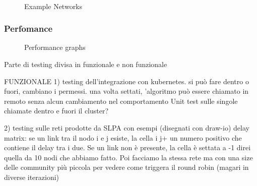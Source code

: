 \begin{figure}[]
    \centering
    \\
    \caption{Example Networks}
\end{figure}






\subsubsection*{Perfomance}


\begin{figure}[]
    \hspace*{-15pt}
    \centering
    \caption{Performance graphs}
\end{figure}


Parte di testing divisa in funzionale e non funzionale

FUNZIONALE
1) testing dell'integrazione con kubernetes.
    si può fare dentro o fuori, cambiano i permessi.
    una volta settati, 'algoritmo può essere chiamato in remoto senza alcun cambiamento nel comportamento
    Unit test sulle singole chiamate dentro e fuori il cluster?

2) testing sulle reti prodotte da SLPA con esempi (disegnati con draw-io)
    delay matrix: se un link tra il nodo i e j esiste, la cella i j+ un numero positivo che contiene il delay tra i
    due. Se un link non è presente, la cella è settata a -1 
    direi quella da 10 nodi che abbiamo fatto. Poi facciamo la stessa rete ma con una size delle 
    community più piccola per vedere come triggera il round robin (magari in diverse iterazioni)

